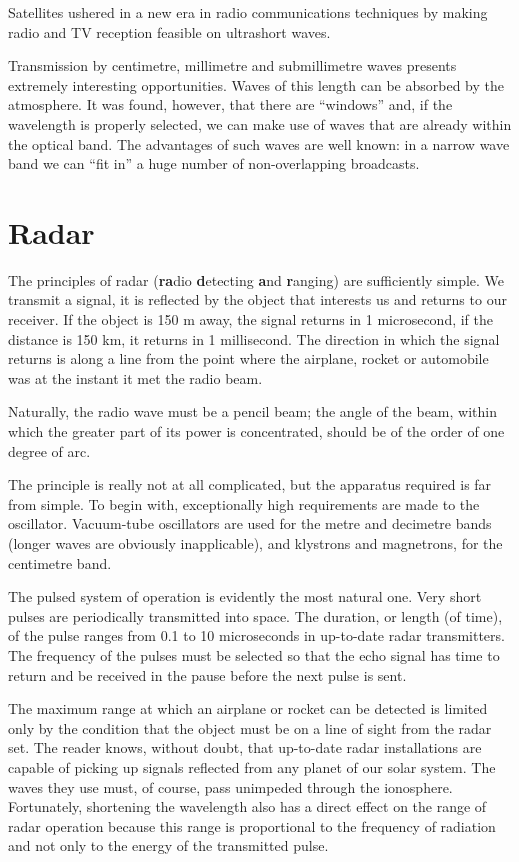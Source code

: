 Satellites ushered in a new era in radio communications techniques by making radio and TV reception feasible on ultrashort waves.

Transmission by centimetre, millimetre and submillimetre waves presents extremely interesting opportunities. Waves of this length can be absorbed by the atmosphere. It was found, however, that there are ``windows'' and, if the wavelength is properly selected, we can make use of waves that are already within the optical band. The advantages of such waves are well known: in a narrow wave band we can ``fit in'' a huge number of non-overlapping broadcasts.

\section{Radar}
The principles of radar (\textbf{ra}dio \textbf{d}etecting \textbf{a}nd \textbf{r}anging) are sufficiently simple. We transmit a signal, it is reflected by the object that interests us and returns to our receiver. If the object is 150 m away, the signal returns in 1 microsecond, if the distance is 150 km, it returns in 1 millisecond. The direction in which the signal returns is along a line from the point where the airplane, rocket or automobile was at the instant it met the radio beam.

Naturally, the radio wave must be a pencil beam; the angle of the beam, within which the greater part of its power is concentrated, should be of the order of one degree of arc.

The principle is really not at all complicated, but the apparatus required is far from simple. To begin with, exceptionally high requirements are made to the oscillator. Vacuum-tube oscillators are used for the metre and decimetre bands (longer waves are obviously inapplicable), and klystrons and magnetrons, for the centimetre band.

The pulsed system of operation is evidently the most natural one. Very short pulses are periodically transmitted into space. The duration, or length (of time), of the pulse ranges from 0.1 to 10 microseconds in up-to-date radar transmitters. The frequency of the pulses must be selected so that the echo signal has time to return and be received in the pause before the next pulse is sent.

The maximum range at which an airplane or rocket can be detected is limited only by the condition that the object must be on a line of sight from the radar set. The reader knows, without doubt, that up-to-date radar installations are capable of picking up signals reflected from any planet of our solar system. The waves they use must, of course, pass unimpeded through the ionosphere. Fortunately, shortening the wavelength also has a direct effect on the range of radar operation because this range is proportional to the frequency of radiation and not only to the energy of the transmitted pulse.

